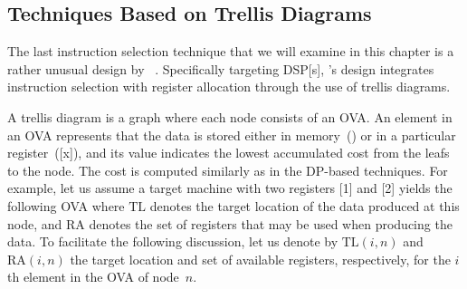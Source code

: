 {\subsection{Techniques Based on Trellis Diagrams}

The last \gls{instruction selection} technique that we will examine in this
chapter is a rather unusual design by \citeauthor{Wess1992}~\cite{Wess1992,
  Wess1995}.
%
Specifically targeting \glsdesc{DSP}[s], \citeauthor{Wess1992}'s
design integrates \gls{instruction selection} with \gls{register allocation}
through the use of \glspl{trellis diagram}.

A \gls{trellis diagram} is a graph where each \gls{node} consists of an
\gls{OVA}.
%
An element in an \gls{OVA} represents that the data is stored either
in memory~() or in a particular \gls{register}~([x]), and its value
indicates the lowest accumulated cost from the \glspl{leaf} to the
\gls{node}.
%
The cost is computed similarly as in the \gls{DP}-based
techniques.
%
For example, let us assume a \gls{target machine} with two
\glspl{register} [1] and [2] yields the following \gls{OVA}
%
\def\mTL{\text{TL}}
\def\mRA{\text{RA}}
%
%
where $\mTL$ denotes the target location of the data produced at this
\gls{node}, and $\mRA$ denotes the set of \glspl{register} that may be used when
producing the data.
%
To facilitate the following discussion, let us denote by
\mbox{$\mTL(i, n)$} and \mbox{$\mRA(i, n)$} the target location and set of
available \glspl{register}, respectively, for the $i$th element in the \gls{OVA}
of node~$n$.

}
